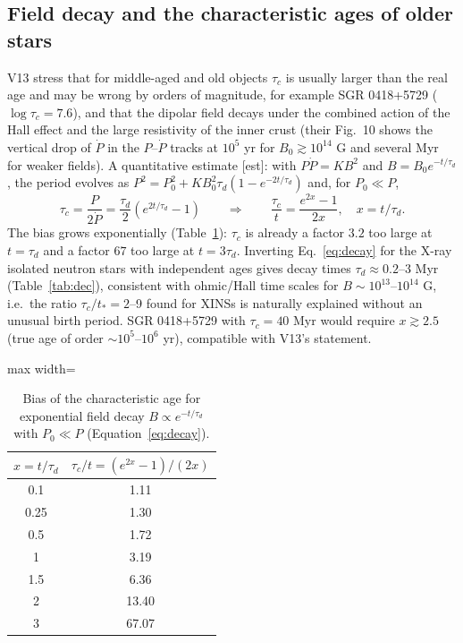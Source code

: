 \documentclass[11pt,a4paper]{article}
\newcommand{\src}[1]{\textsf{[#1]}}
\begin{document}
\subsection{Field decay and the characteristic ages of older stars}\label{sec:decay}
V13 stress that for middle-aged and old objects $\tau_c$ is usually larger than the real age and may be wrong by orders of magnitude, for example SGR 0418+5729 ($\log\tau_c=7.6$), and that the dipolar field decays under the combined action of the Hall effect and the large resistivity of the inner crust (their Fig.~10 shows the vertical drop of $\dot P$ in the $P$--$\dot P$ tracks at $10^5$ yr for $B_0\gtrsim10^{14}$ G and several Myr for weaker fields). A quantitative estimate \src{est}: with $P\dot P=KB^2$ and $B=B_0e^{-t/\tau_d}$, the period evolves as $P^2=P_0^2+KB_0^2\tau_d(1-e^{-2t/\tau_d})$ and, for $P_0\ll P$,
\begin{equation}\label{eq:decay}
\tau_c=\frac{P}{2\dot P}=\frac{\tau_d}{2}\left(e^{2t/\tau_d}-1\right)\qquad\Rightarrow\qquad \frac{\tau_c}{t}=\frac{e^{2x}-1}{2x},\quad x=t/\tau_d .
\end{equation}
The bias grows exponentially (Table~\ref{tab:gen}): $\tau_c$ is already a factor $3.2$ too large at $t=\tau_d$ and a factor $67$ too large at $t=3\tau_d$. Inverting Eq.~\eqref{eq:decay} for the X-ray isolated neutron stars with independent ages gives decay times $\tau_d\approx0.2$--$3$ Myr (Table~\ref{tab:dec}), consistent with ohmic/Hall time scales for $B\sim10^{13}$--$10^{14}$ G, i.e.\ the ratio $\tau_c/t_*=2$--9 found for XINSs is naturally explained without an unusual birth period. SGR 0418+5729 with $\tau_c=40$ Myr would require $x\gtrsim2.5$ (true age of order $\sim10^5$--$10^6$ yr), compatible with V13's statement.

\begin{table}[htbp]
\centering\small
\caption{Bias of the characteristic age for exponential field decay $B\propto e^{-t/\tau_d}$ with $P_0\ll P$ (Equation~\ref{eq:decay}).}\label{tab:gen}
\begin{adjustbox}{max width=\textwidth}\begin{tabular}{cc}
\toprule
$x=t/\tau_d$ & $\tau_c/t=(e^{2x}-1)/(2x)$\\
\midrule
0.1 & 1.11\\
0.25 & 1.30\\
0.5 & 1.72\\
1 & 3.19\\
1.5 & 6.36\\
2 & 13.40\\
3 & 67.07\\
\bottomrule
\end{tabular}\end{adjustbox}
\end{table}
\end{document}
